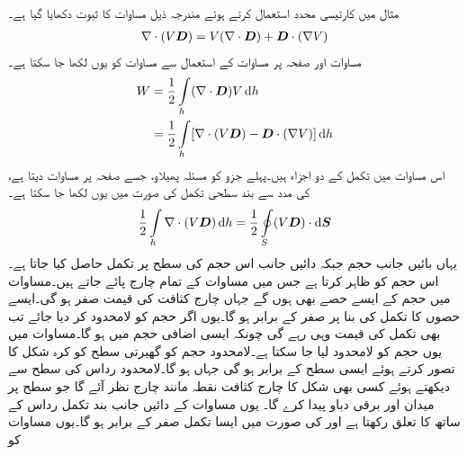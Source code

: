 مثال  میں کارتیسی محدد استعمال کرتے ہوئے مندرجہ ذیل مساوات کا ثبوت دکھایا گیا ہے۔
\begin{align}\label{مساوات_توانائی_توانائی_ضرب_برقی_بہاو_کی_ڈھلان}
\nabla \cdot  (V {{\boldsymbol{D}}})=V (\nabla \cdot {\ensuremath{{\boldsymbol{D}}}})+{{\boldsymbol{D}}} \cdot (\nabla V)
\end{align}
مساوات  اور  صفحہ  پر مساوات  کے استعمال سے مساوات  کو یوں لکھا جا سکتا ہے۔
\begin{gather}
\begin{aligned}\label{مساوات_توانائی_کا_تکمل}
W&=\frac{1}{2}\int\limits_h (\nabla \cdot \kvec{D} )V \dif h\\
&=\frac{1}{2} \int \limits_h [\nabla \cdot (V \kvec{D})-\kvec{D} \cdot (\nabla V)] \dif h
\end{aligned}
\end{gather}
اس مساوات میں تکمل کے دو اجزاء ہیں۔پہلے جزو کو مسئلہ پھیلاو، جسے صفحہ  پر مساوات   دیتا ہے، کی مدد سے بند سطحی تکمل کی صورت میں یوں لکھا جا سکتا ہے۔
\begin{align}\label{مساوات_توانائی_لامحدود_سطح_بند_تکمل_صفر}
\frac{1}{2}\int\limits_h \nabla \cdot (V \kvec{D}) \dif h = \frac{1}{2}\oint \limits_S (V \kvec{D}) \cdot \dif \kvec{S}
\end{align} 
یہاں بائیں جانب حجم  جبکہ دائیں جانب اس حجم کی سطح  پر تکمل حاصل کیا جاتا ہے۔ اس حجم کو ظاہر کرتا ہے جس میں مساوات  کے تمام چارج پائے جاتے ہیں۔مساوات  میں حجم کے ایسے حصے بھی ہوں گے جہاں چارج کثافت  کی قیمت صفر ہو گی۔ایسے حصوں کا تکمل  کی بنا پر صفر کے برابر ہو گا۔یوں اگر حجم کو لامحدود کر دیا جائے تب بھی تکمل کی قیمت وہی رہے گی چونکہ ایسی اضافی حجم میں   ہو گا۔مساوات  میں یوں حجم کو لامحدود لیا جا سکتا ہے۔لامحدود حجم کو گھیرتی سطح کو کرہ شکل کا تصور کرتے ہوئے ایسی سطح  کے برابر ہو گی جہاں  ہو گا۔لامحدود رداس کی سطح سے دیکھتے ہوئے کسی بھی شکل کا چارج کثافت نقطہ مانند چارج  نظر آئے گا جو سطح پر  میدان اور  برقی دباو پیدا کرے گا۔ یوں مساوات   کے دائیں جانب بند تکمل رداس کے ساتھ  کا تعلق رکھتا ہے اور  کی صورت میں ایسا تکمل صفر کے برابر ہو گا۔یوں  مساوات  کو
